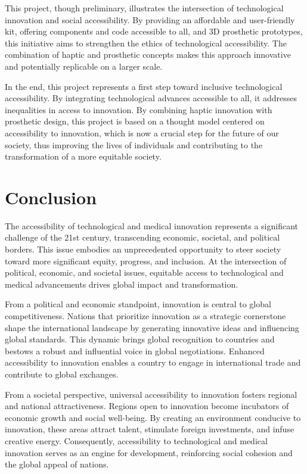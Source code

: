 This project, though preliminary, illustrates the intersection of technological innovation and social accessibility. By providing an affordable and user-friendly kit, offering components and code accessible to all, and 3D prosthetic prototypes, this initiative aims to strengthen the ethics of technological accessibility. The combination of haptic and prosthetic concepts makes this approach innovative and potentially replicable on a larger scale.

In the end, this project represents a first step toward inclusive technological accessibility. By integrating technological advances accessible to all, it addresses inequalities in access to innovation. By combining haptic innovation with prosthetic design, this project is based on a thought model centered on accessibility to innovation, which is now a crucial step for the future of our society, thus improving the lives of individuals and contributing to the transformation of a more equitable society.

\section{Conclusion}
The accessibility of technological and medical innovation represents a significant challenge of the 21st century, transcending economic, societal, and political borders. This issue embodies an unprecedented opportunity to steer society toward more significant equity, progress, and inclusion. At the intersection of political, economic, and societal issues, equitable access to technological and medical advancements drives global impact and transformation.

From a political and economic standpoint, innovation is central to global competitiveness. Nations that prioritize innovation as a strategic cornerstone shape the international landscape by generating innovative ideas and influencing global standards. This dynamic brings global recognition to countries and bestows a robust and influential voice in global negotiations. Enhanced accessibility to innovation enables a country to engage in international trade and contribute to global exchanges.

From a societal perspective, universal accessibility to innovation fosters regional and national attractiveness. Regions open to innovation become incubators of economic growth and social well-being. By creating an environment conducive to innovation, these areas attract talent, stimulate foreign investments, and infuse creative energy. Consequently, accessibility to technological and medical innovation serves as an engine for development, reinforcing social cohesion and the global appeal of nations.

